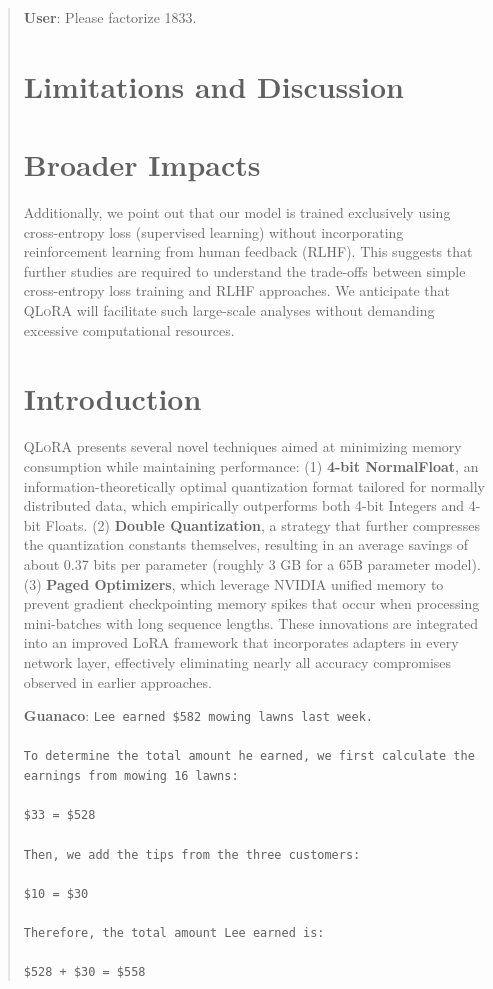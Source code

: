 \begin{quote}
    \textbf{User}: Please factorize 1833.

\section{Limitations and Discussion}

\section{Broader Impacts}

Additionally, we point out that our model is trained exclusively using cross-entropy loss (supervised learning) without incorporating reinforcement learning from human feedback (RLHF). This suggests that further studies are required to understand the trade-offs between simple cross-entropy loss training and RLHF approaches. We anticipate that \textsc{QLoRA} will facilitate such large-scale analyses without demanding excessive computational resources.

\section{Introduction}

\textsc{QLoRA} presents several novel techniques aimed at minimizing memory consumption while maintaining performance: (1) \textbf{4-bit NormalFloat}, an information-theoretically optimal quantization format tailored for normally distributed data, which empirically outperforms both 4-bit Integers and 4-bit Floats. (2) \textbf{Double Quantization}, a strategy that further compresses the quantization constants themselves, resulting in an average savings of about 0.37 bits per parameter (roughly 3 GB for a 65B parameter model). (3) \textbf{Paged Optimizers}, which leverage NVIDIA unified memory to prevent gradient checkpointing memory spikes that occur when processing mini-batches with long sequence lengths. These innovations are integrated into an improved LoRA framework that incorporates adapters in every network layer, effectively eliminating nearly all accuracy compromises observed in earlier approaches.

    \textbf{Guanaco}: \texttt{Lee earned \$582 mowing lawns last week. \\ \\ To determine the total amount he earned, we first calculate the earnings from mowing 16 lawns: \\ \\  \$33  = \$528 \\ \\ Then, we add the tips from the three customers: \\  \\ \$10  = \$30 \\ \\ Therefore, the total amount Lee earned is: \\ \\ \$528 + \$30 = \$558}
\end{quote}

